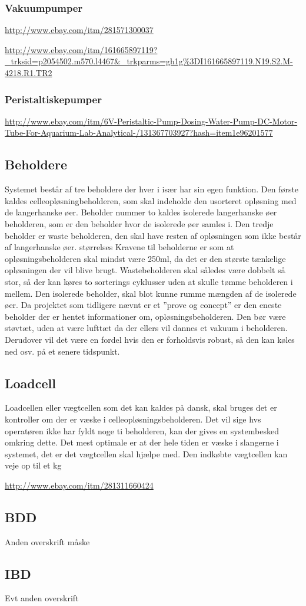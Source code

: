 \subsubsection{Vakuumpumper}
\url{ http://www.ebay.com/itm/281571300037}

\url{http://www.ebay.com/itm/161665897119?_trksid=p2054502.m570.l4467&_trkparms=gh1g%3DI161665897119.N19.S2.M-4218.R1.TR2}

\subsubsection{Peristaltiskepumper}

\url{http://www.ebay.com/itm/6V-Peristaltic-Pump-Dosing-Water-Pump-DC-Motor-Tube-For-Aquarium-Lab-Analytical-/131367703927?hash=item1e96201577}

\subsection{Beholdere}
Systemet består af tre beholdere der hver i især har sin egen funktion. Den første kaldes celleopløsningbeholderen, som skal indeholde den usorteret opløsning med de langerhanske øer. Beholder nummer to kaldes isolerede langerhanske øer beholderen, som er den beholder hvor de isolerede øer samles i. Den tredje beholder er waste beholderen, den skal have resten af opløsningen som ikke består af langerhanske øer. størrelses Kravene til beholderne er som at opløsningsbeholderen skal mindst være 250ml, da det er den største tænkelige opløsningen der vil blive brugt. Wastebeholderen skal således være dobbelt så stor, så der kan køres to sorterings cyklusser uden at skulle tømme beholderen i mellem. Den isolerede beholder, skal blot kunne rumme mængden af de isolerede øer. Da projektet som tidligere nævnt er et ”prove og concept” er den eneste beholder der er hentet informationer om, opløsningsbeholderen. Den bør være støvtæt, uden at være lufttæt da der ellers vil dannes et vakuum i beholderen. Derudover vil det være en fordel hvis den er forholdsvis robust, så den kan køles ned osv. på et senere tidspunkt.

\subsection{Loadcell}
Loadcellen eller vægtcellen som det kan kaldes på dansk, skal bruges det er kontroller om der er væske i celleopløsningsbeholderen. Det vil sige hvs operatøren ikke har fyldt noge ti beholderen, kan der gives en systembesked omkring dette. Det mest optimale er at der hele tiden er væske i slangerne i systemet, det er det vægtcellen skal hjælpe med. Den indkøbte vægtcellen kan veje op til et kg

\url{http://www.ebay.com/itm/281311660424}


\subsection{BDD}
Anden overskrift måske
\subsection{IBD}
Evt anden overskrift
